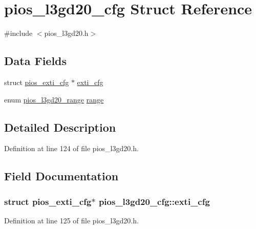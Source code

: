 \hypertarget{structpios__l3gd20__cfg}{\section{pios\-\_\-l3gd20\-\_\-cfg Struct Reference}
\label{structpios__l3gd20__cfg}
}


{\ttfamily \#include $<$pios\-\_\-l3gd20.\-h$>$}

\subsection*{Data Fields}
\begin{DoxyCompactItemize}
\item 
struct \hyperlink{structpios__exti__cfg}{pios\-\_\-exti\-\_\-cfg} $\ast$ \hyperlink{structpios__l3gd20__cfg_a7b77b9fb8ef5db1018c7c4d4edd42de7}{exti\-\_\-cfg}
\item 
enum \hyperlink{group___p_i_o_s___l3_g_d20_ga704696d385abb591516d2e31301dad66}{pios\-\_\-l3gd20\-\_\-range} \hyperlink{structpios__l3gd20__cfg_acc8d8efddd5b48a7febd54c5a4c5cb4b}{range}
\end{DoxyCompactItemize}


\subsection{Detailed Description}


Definition at line 124 of file pios\-\_\-l3gd20.\-h.



\subsection{Field Documentation}
\hypertarget{structpios__l3gd20__cfg_a7b77b9fb8ef5db1018c7c4d4edd42de7}{
\subsubsection[{exti\-\_\-cfg}]{\setlength{\rightskip}{0pt plus 5cm}struct {\bf pios\-\_\-exti\-\_\-cfg}$\ast$ pios\-\_\-l3gd20\-\_\-cfg\-::exti\-\_\-cfg}}\label{structpios__l3gd20__cfg_a7b77b9fb8ef5db1018c7c4d4edd42de7}


Definition at line 125 of file pios\-\_\-l3gd20.\-h.

